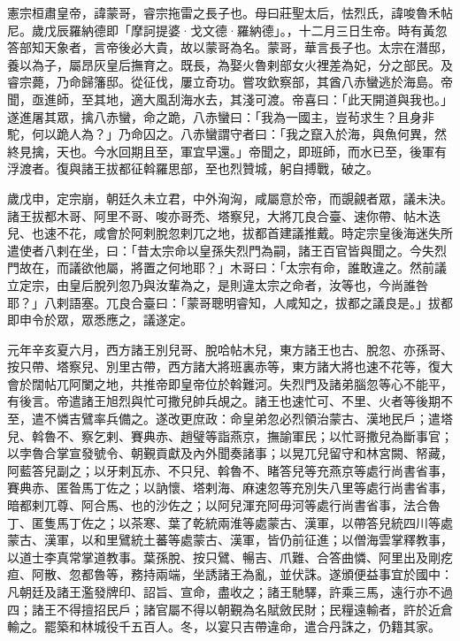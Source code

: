 
\begin{pinyinscope}

 憲宗桓肅皇帝，諱蒙哥，睿宗拖雷之長子也。母曰莊聖太后，怯烈氏，諱唆魯禾帖尼。歲戊辰羅納德即「摩訶提婆·戈文德·羅納德」。，十二月三日生帝。時有黃忽答部知天象者，言帝後必大貴，故以蒙哥為名。蒙哥，華言長子也。太宗在潛邸，養以為子，屬昂灰皇后撫育之。既長，為娶火魯剌部女火裡差為妃，分之部民。及睿宗薨，乃命歸籓邸。從征伐，屢立奇功。嘗攻欽察部，其酋八赤蠻逃於海島。帝聞，亟進師，至其地，適大風刮海水去，其淺可渡。帝喜曰：「此天開道與我也。」遂進屠其眾，擒八赤蠻，命之跪，八赤蠻曰：「我為一國主，豈茍求生？且身非駝，何以跪人為？」乃命囚之。八赤蠻謂守者曰：「我之竄入於海，與魚何異，然終見擒，天也。今水回期且至，軍宜早還。」帝聞之，即班師，而水已至，後軍有浮渡者。復與諸王拔都征斡羅思部，至也烈贊城，躬自搏戰，破之。



 歲戊申，定宗崩，朝廷久未立君，中外洶洶，咸屬意於帝，而覬覦者眾，議未決。諸王拔都木哥、阿里不哥、唆亦哥禿、塔察兒，大將兀良合臺、速你帶、帖木迭兒、也速不花，咸會於阿剌脫忽剌兀之地，拔都首建議推戴。時定宗皇後海迷失所遣使者八剌在坐，曰：「昔太宗命以皇孫失烈門為嗣，諸王百官皆與聞之。今失烈門故在，而議欲他屬，將置之何地耶？」木哥曰：「太宗有命，誰敢違之。然前議立定宗，由皇后脫列忽乃與汝輩為之，是則違太宗之命者，汝等也，今尚誰咎耶？」八剌語塞。兀良合臺曰：「蒙哥聰明睿知，人咸知之，拔都之議良是。」拔都即申令於眾，眾悉應之，議遂定。



 元年辛亥夏六月，西方諸王別兒哥、脫哈帖木兒，東方諸王也古、脫忽、亦孫哥、按只帶、塔察兒、別里古帶，西方諸大將班裏赤等，東方諸大將也速不花等，復大會於闊帖兀阿闌之地，共推帝即皇帝位於斡難河。失烈門及諸弟腦忽等心不能平，有後言。帝遣諸王旭烈與忙可撒兒帥兵覘之。諸王也速忙可、不里、火者等後期不至，遣不憐吉鷿率兵備之。遂改更庶政：命皇弟忽必烈領治蒙古、漢地民戶；遣塔兒、斡魯不、察乞剌、賽典赤、趙璧等詣燕京，撫諭軍民；以忙哥撒兒為斷事官；以孛魯合掌宣發號令、朝覲貢獻及內外聞奏諸事；以晃兀兒留守和林宮闕、帑藏，阿藍答兒副之；以牙剌瓦赤、不只兒、斡魯不、睹答兒等充燕京等處行尚書省事，賽典赤、匿昝馬丁佐之；以訥懷、塔剌海、麻速忽等充別失八里等處行尚書省事，暗都剌兀尊、阿合馬、也的沙佐之；以阿兒渾充阿毋河等處行尚書省事，法合魯丁、匿隻馬丁佐之；以茶寒、葉了乾統兩淮等處蒙古、漢軍，以帶答兒統四川等處蒙古、漢軍，以和里鷿統土蕃等處蒙古、漢軍，皆仍前征進；以僧海雲掌釋教事，以道士李真常掌道教事。葉孫脫、按只鷿、暢吉、爪難、合答曲憐、阿里出及剛疙疸、阿散、忽都魯等，務持兩端，坐誘諸王為亂，並伏誅。遂頒便益事宜於國中：凡朝廷及諸王濫發牌印、詔旨、宣命，盡收之；諸王馳驛，許乘三馬，遠行亦不過四；諸王不得擅招民戶；諸官屬不得以朝覲為名賦斂民財；民糧遠輸者，許於近倉輸之。罷築和林城役千五百人。冬，以宴只吉帶違命，遣合丹誅之，仍籍其家。




\end{pinyinscope}
